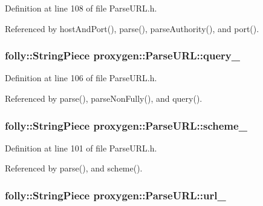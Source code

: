 Definition at line 108 of file Parse\+U\+R\+L.\+h.



Referenced by host\+And\+Port(), parse(), parse\+Authority(), and port().

\subsubsection[{query\+\_\+}]{\setlength{\rightskip}{0pt plus 5cm}folly\+::\+String\+Piece proxygen\+::\+Parse\+U\+R\+L\+::query\+\_\+\hspace{0.3cm}{\ttfamily [private]}}\label{classproxygen_1_1ParseURL_a0903ad1ee3354e465733bdb2ddd53d67}


Definition at line 106 of file Parse\+U\+R\+L.\+h.



Referenced by parse(), parse\+Non\+Fully(), and query().

\subsubsection[{scheme\+\_\+}]{\setlength{\rightskip}{0pt plus 5cm}folly\+::\+String\+Piece proxygen\+::\+Parse\+U\+R\+L\+::scheme\+\_\+\hspace{0.3cm}{\ttfamily [private]}}\label{classproxygen_1_1ParseURL_ad1b80314936c29bdb644aa0fe3fb97c3}


Definition at line 101 of file Parse\+U\+R\+L.\+h.



Referenced by parse(), and scheme().

\subsubsection[{url\+\_\+}]{\setlength{\rightskip}{0pt plus 5cm}folly\+::\+String\+Piece proxygen\+::\+Parse\+U\+R\+L\+::url\+\_\+\hspace{0.3cm}{\ttfamily [private]}}\label{classproxygen_1_1ParseURL_a57a4a1b9155e7bcc3cde2bb825a5b075}


